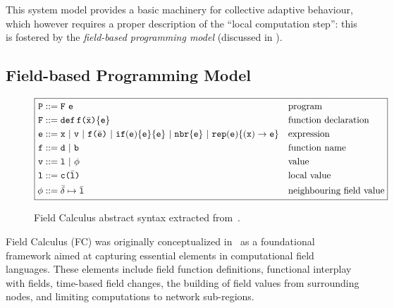 This system model provides a basic machinery for collective adaptive behaviour,
 which however requires a proper description of the ``local computation step'': this is fostered by the \emph{field-based programming model} (discussed in ).
%

\subsection{Field-based Programming Model}
\begin{figure}
\begin{align*}
    \boxed{
    \begin{aligned}
    \q{P} &::= \q{F}\ \q{e} && \text{program} \\
    \q{F} &::= \q{def} \, \q{f(}\bar{\q{x}}\q{)} \{\q{e}\} && \text{function declaration} \\
    \q{e} &::= \q{x} \ | \ \q{v} \ | \ \q{f(}\bar{\q{e}}\q{)} \ | \ \q{if}(\q{e})\{\q{e}\}\{\q{e}\} \ | \ \q{nbr}\{\q{e}\} \ | \ \q{rep}(\q{e})\{(\q{x}) \rightarrow \q{e}\} && \text{expression} \\
    \q{f} &::= \q{d} \ | \ \q{b} && \text{function name} \\
    \q{v} &::= \q{l} \ | \ \phi && \text{value} \\
    \q{l} &::= \q{c(}\bar{\q{l}}\q{)} && \text{local value} \\
    \phi &::= \bar{\delta} \mapsto \bar{\q{l}} && \text{neighbouring field value}
    \end{aligned}
    }
\end{align*}
\caption{Field Calculus abstract syntax extracted from~\cite{DBLP:journals/tomacs/ViroliABDP18}.}
\label{fig:field-calculus-abstract-syntax}
\end{figure}
\label{sec:field-based-programming-model}
Field Calculus (FC) was originally conceptualized in~\cite{viroli2013calculus}
 as a foundational framework aimed at capturing essential elements in computational field languages. 
 These elements include field function definitions, 
 functional interplay with fields, 
 time-based field changes, 
 the building of field values from surrounding nodes, 
 and limiting computations to network sub-regions.

